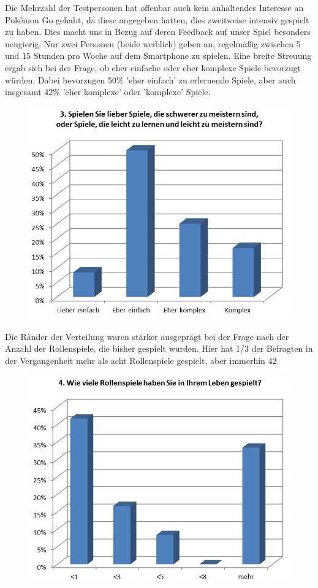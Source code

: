\documentclass[extern,palatino]{cgBA}
\begin{document}
Die Mehrzahl der Testpersonen hat offenbar auch kein anhaltendes Interesse an Pokémon Go gehabt, da diese angegeben hatten, dies zweitweise intensiv gespielt zu haben. Dies macht uns in Bezug auf deren Feedback auf unser Spiel besonders neugierig. Nur zwei Personen (beide weiblich) geben an, regelmäßig zwischen 5 und 15 Stunden pro Woche auf dem Smartphone zu spielen. 
Eine breite Streuung ergab sich bei der Frage, ob eher einfache oder eher komplexe Spiele bevorzugt würden. Dabei bevorzugen 50\% 'eher einfach' zu erlernende Spiele, aber auch insgesamt 42\% 'eher komplexe' oder 'komplexe' Spiele. 
\begin{figure}[H]
	\centering
	\includegraphics[width=1\textwidth]{table2.jpg}
\end{figure}
Die Ränder der Verteilung  waren stärker ausgeprägt bei der Frage nach der Anzahl der Rollenspiele, die bisher gespielt wurden. Hier hat 1/3 der Befragten in der Vergangenheit mehr als acht Rollenspiele gespielt, aber immerhin 42 %
\begin{figure}[H]
	\centering
	\includegraphics[width=1\textwidth]{table3.jpg}
\end{figure}
\end{document}
